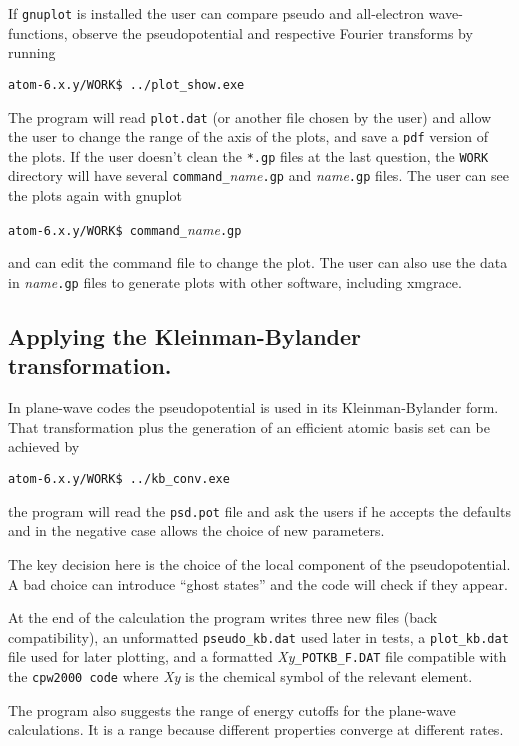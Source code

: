 \documentclass[11pt]{article}
\begin{document}
If \texttt{gnuplot} is installed the user can compare pseudo and all-electron wave-functions,
observe the pseudopotential and respective Fourier transforms by running

\noindent\texttt{atom-6.x.y/WORK\$ ../plot{\_}show.exe}

The program will read \texttt{plot.dat} (or another file chosen by the user) and allow
the user to change the range of the axis of the plots, and save a \texttt{pdf} version of
the plots.  If the user doesn't clean the \texttt{*.gp} files at the last question,
the \texttt{WORK} directory will have several \texttt{command{\_}}{\it name}\texttt{.gp} and
{\it name}\texttt{.gp} files.  The user can see the plots again with gnuplot

\noindent\texttt{atom-6.x.y/WORK\$ command{\_}}{\it name}\texttt{.gp}

and can edit the command file to change the plot.  The user can also use the data in {\it name}\texttt{.gp} files
to generate plots with other software, including xmgrace.


\subsection{Applying the Kleinman-Bylander transformation.}
\label{sec:run-KB}

In plane-wave codes the pseudopotential is used in its Kleinman-Bylander form.  That transformation
plus the generation of an efficient atomic basis set can be achieved by

\noindent\texttt{atom-6.x.y/WORK\$ ../kb{\_}conv.exe}

the program will read the \texttt{psd.pot} file and ask the users if he accepts the defaults and
in the negative case allows the choice of new parameters.

The key decision here is the choice of the local component of the pseudopotential.  A bad choice
can introduce ``ghost states'' and the code will check if they appear.

At the end of the calculation the program writes three new files (back compatibility), an unformatted
\texttt{pseudo{\_}kb.dat} used later in tests,
a \texttt{plot{\_}kb.dat} file used for later plotting, and
a formatted {\it Xy}\texttt{{\_}POTKB{\_}F.DAT} file compatible with the \texttt{cpw2000 code} where  {\it Xy}
is the chemical symbol of the relevant element.

The program also suggests the range of energy cutoffs for the plane-wave calculations.  It is a range because
different properties converge at different rates.
\end{document}
